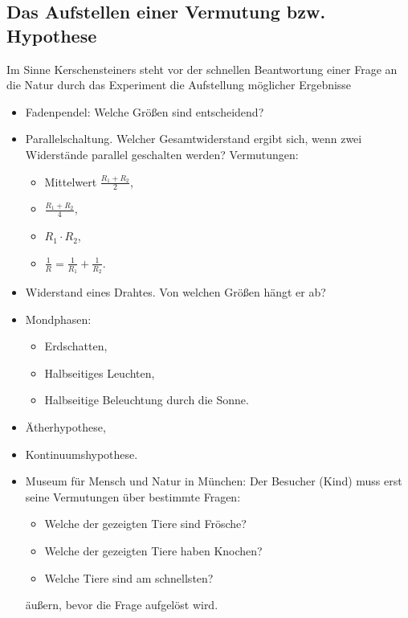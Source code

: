 \subsection{Das Aufstellen einer Vermutung bzw. Hypothese}
Im Sinne Kerschensteiners  steht vor der schnellen Beantwortung einer
Frage an die Natur durch das Experiment die Aufstellung m\"{o}glicher Ergebnisse
\bip
\begin{beisp}
	\begin{itemize}
\item
Fadenpendel: Welche Gr\"{o}{\ss}en sind entscheidend?
\item Parallelschaltung. Welcher Gesamtwiderstand ergibt sich,
wenn zwei Widerst\"{a}nde parallel geschalten werden? Vermutungen:
    \begin{itemize}
      \item Mittelwert $\frac{R_1 + R_2}2$,
      \item $\frac{R_1+R_2}4$,
      \item $R_1 \cdot R_2$,
      \item $\frac{1}{R} = \frac{1}{R_1} + \frac{1}{R_2}$.
    \end{itemize}
\item Widerstand eines Drahtes. Von welchen Gr\"{o}{\ss}en h\"{a}ngt er ab?
\item Mondphasen:
\begin{itemize}
  \item Erdschatten,
  \item Halbseitiges Leuchten,
  \item Halbseitige Beleuchtung durch die Sonne.
\end{itemize}
\item \"{A}therhypothese,
\item Kontinuumshypothese.
\item Museum f\"{u}r Mensch und Natur in M\"{u}nchen: Der Besucher (Kind) muss erst
seine Vermutungen \"{u}ber bestimmte Fragen:
\begin{itemize}
\item Welche der gezeigten Tiere sind Fr\"{o}sche?
\item Welche der gezeigten Tiere haben Knochen?
\item Welche Tiere sind am schnellsten?
\end{itemize}
\"{a}u{\ss}ern, bevor die Frage aufgel\"{o}st wird.
\end{itemize}
\end{beisp}



